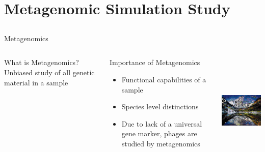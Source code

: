 \documentclass[11pt]{beamer}
\begin{document}
	
\section{Metagenomic Simulation Study}
\subsection{}
	\begin{frame}{Metagenomics}
	\begin{columns}
	\begin{block}{What is Metagenomics?}
	Unbiased study of all genetic material in a sample
	\end{block}
	\begin{block}{Importance of Metagenomics}
	\begin{itemize}
	\item Functional capabilities of a sample
	\item Species level distinctions
	\item Due to lack of a universal gene marker, phages are studied by metagenomics
	\end{itemize}
	\end{block}
	
	\includegraphics[height=5.5cm, width=5cm]{mosaic.png}
	\end{columns}
	\end{frame}
	
\end{document}
